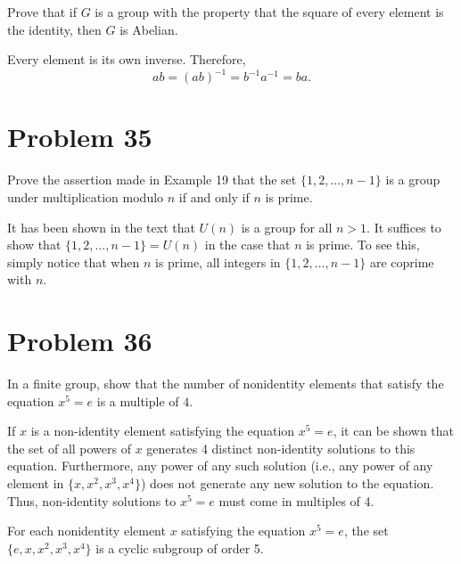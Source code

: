 \documentclass[12pt]{article}
\begin{document}
Prove that if $G$ is a group with the property that the square of every element
is the identity, then $G$ is Abelian.

Every element is its own inverse.  Therefore,
\begin{equation*}
ab = (ab)^{-1} = b^{-1}a^{-1} = ba.
\end{equation*}

\section*{Problem 35}

Prove the assertion made in Example 19 that the set $\{1,2,\dots,n-1\}$
is a group under multiplication modulo $n$ if and only if $n$ is prime.

It has been shown in the text that $U(n)$ is a group for all $n>1$.
It suffices to show that $\{1,2,\dots,n-1\}=U(n)$ in the case that
$n$ is prime.  To see this, simply notice that when $n$ is prime,
all integers in $\{1,2,\dots,n-1\}$ are coprime with $n$.

\section*{Problem 36}

In a finite group, show that the number of nonidentity elements that satisfy
the equation $x^5=e$ is a multiple of $4$.

If $x$ is a non-identity element satisfying the equation $x^5=e$, it can be shown
that the set of all powers of $x$ generates 4 distinct non-identity solutions to this equation.
Furthermore, any power of any such solution (i.e., any power of any element in $\{x,x^2,x^3,x^4\}$) does not generate any new solution
to the equation.  Thus, non-identity solutions to $x^5=e$ must come in multiples of 4.

For each nonidentity element $x$ satisfying the equation $x^5=e$, the set
$\{e,x,x^2,x^3,x^4\}$ is a cyclic subgroup of order 5.
\end{document}
